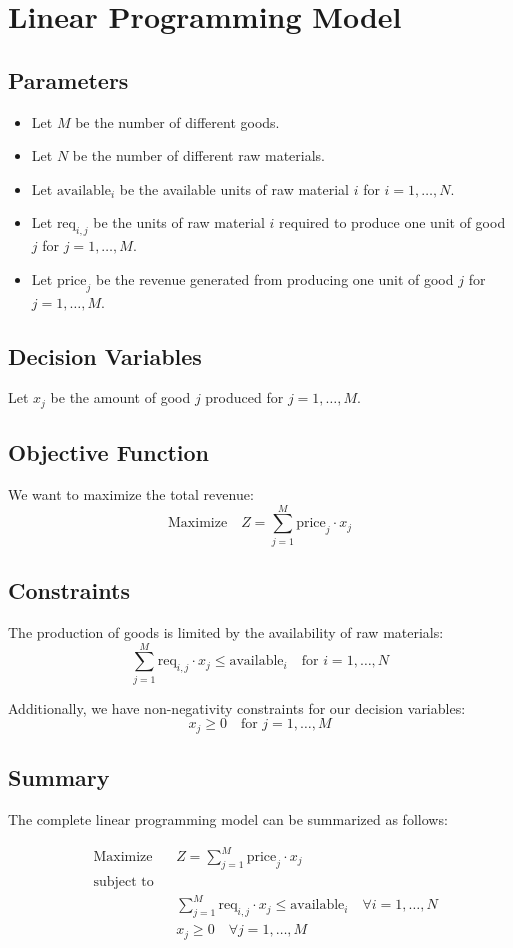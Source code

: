 \documentclass{article}
\begin{document}
\section*{Linear Programming Model}

\subsection*{Parameters}
\begin{itemize}
    \item Let \( M \) be the number of different goods.
    \item Let \( N \) be the number of different raw materials.
    \item Let \( \text{available}_i \) be the available units of raw material \( i \) for \( i = 1, \ldots, N \).
    \item Let \( \text{req}_{i,j} \) be the units of raw material \( i \) required to produce one unit of good \( j \) for \( j = 1, \ldots, M \).
    \item Let \( \text{price}_j \) be the revenue generated from producing one unit of good \( j \) for \( j = 1, \ldots, M \).
\end{itemize}

\subsection*{Decision Variables}
Let \( x_j \) be the amount of good \( j \) produced for \( j = 1, \ldots, M \).

\subsection*{Objective Function}
We want to maximize the total revenue:
\[
\text{Maximize} \quad Z = \sum_{j=1}^{M} \text{price}_j \cdot x_j
\]

\subsection*{Constraints}
The production of goods is limited by the availability of raw materials:
\[
\sum_{j=1}^{M} \text{req}_{i,j} \cdot x_j \leq \text{available}_i \quad \text{for } i = 1, \ldots, N
\]

Additionally, we have non-negativity constraints for our decision variables:
\[
x_j \geq 0 \quad \text{for } j = 1, \ldots, M
\]

\subsection*{Summary}
The complete linear programming model can be summarized as follows:

\[
\begin{aligned}
& \text{Maximize} && Z = \sum_{j=1}^{M} \text{price}_j \cdot x_j \\
& \text{subject to} \\
& && \sum_{j=1}^{M} \text{req}_{i,j} \cdot x_j \leq \text{available}_i \quad \forall i = 1, \ldots, N \\
& && x_j \geq 0 \quad \forall j = 1, \ldots, M
\end{aligned}
\]
\end{document}
